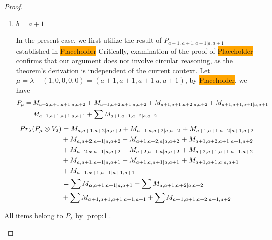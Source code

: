 \begin{proof}
\begin{enumerate}
\begin{enumerate}
        \item $b=a+1$ \par
        In the present case, we first utilize the result of $P_{a+1,a+1,a+1|a,a+1}$ established in \colorbox{orange}{Placeholder} Critically, examination of the proof of \colorbox{orange}{Placeholder} confirms that our argument does not involve circular reasoning, as the theorem's derivation is independent of the current context. Let $\mu = \lambda + (1,0,0,0,0) =(a+1,a+1,a+1|a,a+1) $, by \colorbox{orange}{Placeholder}, we have
        \begin{equation}\notag
          \begin{aligned}
            P_\mu &= M_{a+2,a+1,a+1|a,a+2}
+M_{a+1,a+2,a+1|a,a+2}
+M_{a+1,a+1,a+2|a,a+2}
+M_{a+1,a+1,a+1|a,a+1}\\
                  &=
M_{a+1,a+1,a+1|a,a+1}
+\sum M_{a+1,a+1,a+2|a,a+2}
          \end{aligned}
        \end{equation}
        \begin{equation}\notag
          \begin{aligned}
            Pr_{\lambda}(P_\mu \otimes V_{2}) &=
M_{a,a+1,a+2|a,a+2}
+ M_{a+1,a,a+2|a,a+2}
+ M_{a+1,a+1,a+2|a+1,a+2}\\
                                              &
+ M_{a,a+2,a+1|a,a+2}
+ M_{a+1,a+2,a|a,a+2}
+ M_{a+1,a+2,a+1|a+1,a+2}\\
                                              &
+ M_{a+2,a,a+1|a,a+2}
+ M_{a+2,a+1,a|a,a+2}
+ M_{a+2,a+1,a+1|a+1,a+2}\\
                                              &
+ M_{a,a+1,a+1|a,a+1}
+ M_{a+1,a,a+1|a,a+1}
+ M_{a+1,a+1,a|a,a+1}\\
                                              &
+ M_{a+1,a+1,a+1|a+1,a+1} \\
                                               &=
\sum M_{a,a+1,a+1|a,a+1}
+ \sum M_{a,a+1,a+2|a,a+2}\\
                                              &
+ \sum M_{a+1,a+1,a+1|a+1,a+1}
+ \sum M_{a+1,a+1,a+2|a+1,a+2}
          \end{aligned}
        \end{equation}
      \end{enumerate}
All items belong to $P_\lambda$ by \cref{prop:1}.


\end{enumerate}
\end{proof}
